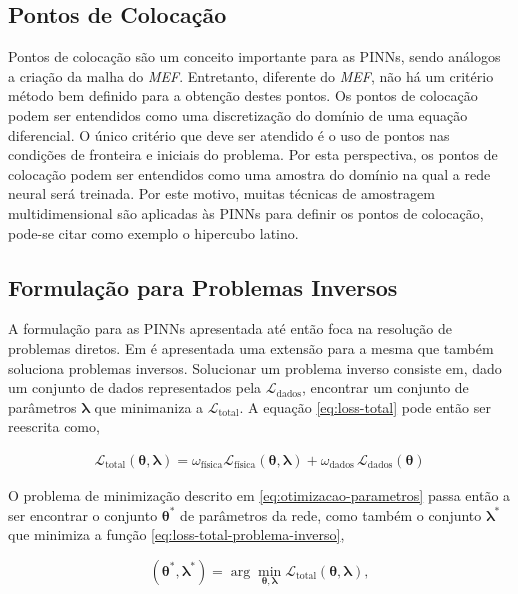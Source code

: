 \subsection{Pontos de Colocação}

Pontos de colocação são um conceito importante para as PINNs, sendo análogos
a criação da malha do \textit{MEF}. Entretanto, diferente do \textit{MEF}, 
não há um critério método bem definido para a obtenção destes pontos. 
Os pontos de colocação podem ser entendidos como uma discretização do domínio
de uma equação diferencial. O único critério que deve ser atendido é o uso
de pontos nas condições de fronteira e iniciais do problema.
Por esta perspectiva, os pontos de colocação podem ser entendidos como uma 
amostra do domínio na qual a rede neural será treinada. 
Por este motivo, muitas técnicas de amostragem multidimensional são 
aplicadas às PINNs para definir os pontos de colocação, pode-se citar como 
exemplo o hipercubo latino.   

\subsection{Formulação para Problemas Inversos}

A formulação para as PINNs apresentada até então foca na resolução de problemas
diretos. Em \cite{raissi-etal:19} é apresentada uma extensão para a mesma que 
também soluciona problemas inversos. Solucionar um problema inverso consiste em,
dado um conjunto de dados representados pela $\mathcal{L}_{\text{dados}}$,
encontrar um conjunto de parâmetros $\boldsymbol{\lambda}$ que minimaniza a
$\mathcal{L}_{\text{total}}$.
A equação \ref{eq:loss-total} pode então ser reescrita como,

\begin{eqnarray}\label{eq:loss-total-problema-inverso} 
    \mathcal{L}_{\text{total}}(\boldsymbol{\theta}, \boldsymbol{\lambda}) 
    = \omega_{\text{física}} \mathcal{L}_{\text{física}}(\boldsymbol{\theta}, \boldsymbol{\lambda}) 
    + \omega_{\text{dados}} \,\mathcal{L}_{\text{dados}}(\boldsymbol{\theta})
\end{eqnarray}

O problema de minimização descrito em \ref{eq:otimizacao-parametros} passa 
então a ser encontrar o conjunto $\boldsymbol{\theta}^*$ de parâmetros da rede,
como também o conjunto $\boldsymbol{\lambda}^*$
que minimiza a função \ref{eq:loss-total-problema-inverso}, 

\begin{equation}\label{eq:otimizacao-parametros-problema-inverso}
   (\boldsymbol{\theta}^*, \boldsymbol{\lambda}^*) 
   = \arg \min_{\boldsymbol{\theta}, \boldsymbol{\lambda}} \mathcal{L}_{\text{total}}(\boldsymbol{\theta}, \boldsymbol{\lambda}), 
\end{equation}

